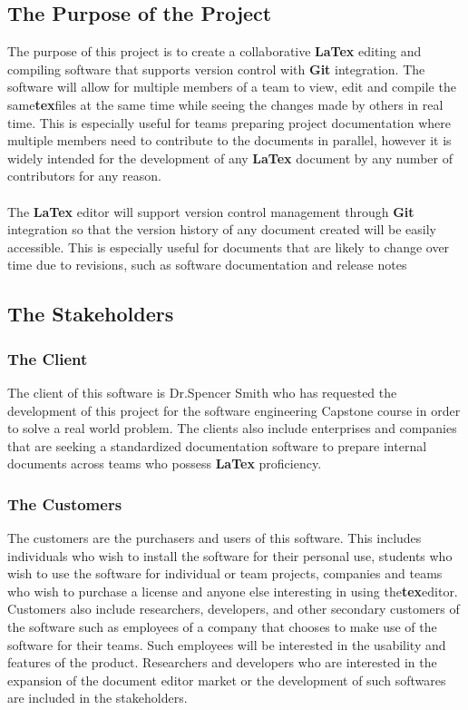 \documentclass[12pt, titlepage]{article}
\begin{document}
	\subsection{The Purpose of the Project}
	
	The purpose of this project is to create a collaborative \textbf{LaTex} editing and compiling software that supports version control with\textbf{ Git }integration. The software will allow for multiple members of a team to view, edit and compile the same\textbf{tex}files at the same time while seeing the changes made by others in real time. This is especially useful for teams preparing project documentation where multiple members need to contribute to the documents in parallel, however it is widely intended for the development of any \textbf{LaTex} document by any number of contributors for any reason.\\
	\\The \textbf{LaTex} editor will support version control management through\textbf{ Git }integration so that the version history of any document created will be easily accessible. This is especially useful for documents that are likely to change over time due to revisions, such as software documentation and release notes
	
	
	\subsection{The Stakeholders}
	
	\subsubsection{The Client}
	
	The client of this software is Dr.Spencer Smith who has requested the development of this project for the software engineering Capstone course in order to solve a real world problem. The clients also include enterprises and companies that are seeking a standardized documentation software to prepare internal documents across teams who possess \textbf{LaTex} proficiency.
	
	\subsubsection{The Customers}
	The customers are the purchasers and users of this software. This includes individuals who wish to install the software for their personal use, students who wish to use the software for individual or team projects, companies and teams who wish to purchase a license and anyone else interesting in using the\textbf{tex}editor.\\
	Customers also include researchers, developers, and other secondary customers of the software such as employees of a company that chooses to make use of the software for their teams. Such employees will be interested in the usability and features of the product. Researchers and developers who are interested in the expansion of the document editor market or the development of such softwares are included in the stakeholders.\\
	
\end{document}
